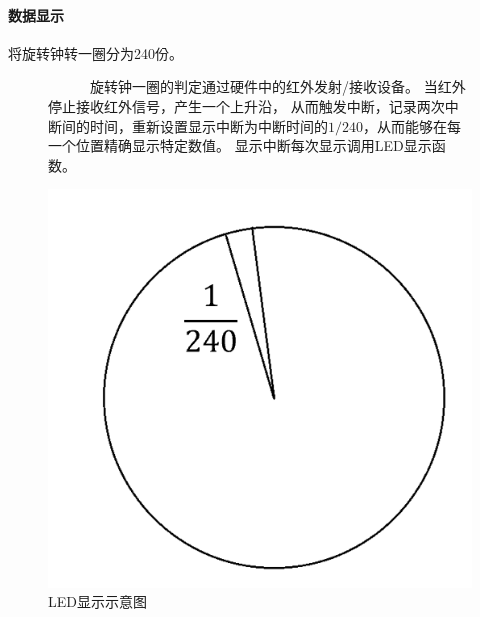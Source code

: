 \documentclass{article}
\begin{document}
\paragraph{数据显示}将旋转钟转一圈分为240份。
\begin{figure}[H]
\begin{minipage}{0.7\textwidth}
\ \ \ \ \ \ 旋转钟一圈的判定通过硬件中的红外发射/接收设备。
当红外停止接收红外信号，产生一个上升沿，
从而触发中断，记录两次中断间的时间，重新设置显示中断为中断时间的$1/240$，从而能够在每一个位置精确显示特定数值。
显示中断每次显示调用LED显示函数。
\end{minipage}
\begin{minipage}{0.29\textwidth}
    \centering
    \includegraphics[width=0.6\linewidth]{assets/4.png}
    \caption{LED显示示意图}
\end{minipage}
\end{figure}
\end{document}
